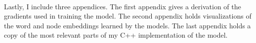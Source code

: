 \paragraph{}
Lastly, I include three appendices. The first appendix gives a derivation of the gradients used in training the model. The second appendix holds visualizations of the word and node embeddings learned by the models. The last appendix holds a copy of the most relevant parts of my C++ implementation of the model.
